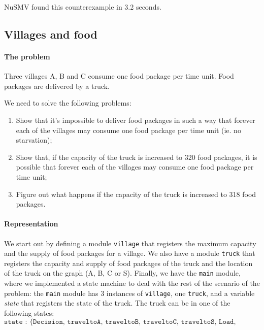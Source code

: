 \documentclass[12pt]{article}
\begin{document}
NuSMV found this counterexample in 3.2 seconds.

\clearpage

\subsection*{Villages and food}
\paragraph{The problem}
Three villages A, B and C consume one food package per time unit. 
Food packages are delivered by a truck. 

We need to solve the following problems:
\begin{enumerate}
\item Show that it's impossible to deliver food packages in such a way that 
forever each of the villages may consume one food package per time unit 
(ie. no starvation);
\item Show that, 
if the capacity of the truck is increased to 320 food packages, 
it is possible that forever each of the villages 
may consume one food package per time unit;
\item Figure out what happens if the capacity of the truck is increased to 318 food packages.
\end{enumerate}

\paragraph{Representation}
We start out by defining a module \texttt{village} that registers the maximum capacity and the supply of food packages for a village.
We also have a module \texttt{truck} that registers 
the capacity and supply of food packages of the truck and 
the location of the truck on the graph (A, B, C or S).
Finally, we have the \texttt{main} module, 
where we implemented a state machine to deal with the 
rest of the scenario of the problem:
the \texttt{main} module has 3 instances of \texttt{village}, 
one \texttt{truck}, 
and a variable \emph{state} that registers the state of the truck. 
The truck can be in one of the following states:
\[\texttt{state : \{Decision, traveltoA, traveltoB, traveltoC, traveltoS, Load, Unload\}}\]
\end{document}
